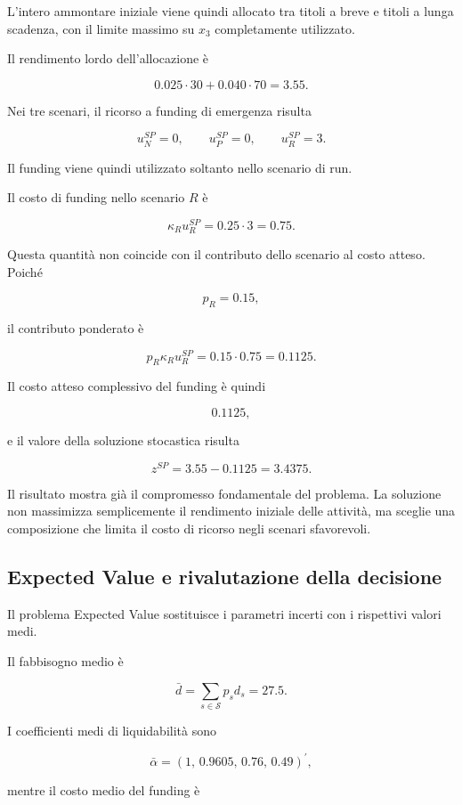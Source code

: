 L'intero ammontare iniziale viene quindi allocato tra titoli a breve e titoli
a lunga scadenza, con il limite massimo su \(x_3\) completamente utilizzato.

Il rendimento lordo dell'allocazione \`e

\[
0.025\cdot 30
+
0.040\cdot 70
=
3.55.
\]

Nei tre scenari, il ricorso a funding di emergenza risulta

\[
u_N^{SP}=0,
\qquad
u_P^{SP}=0,
\qquad
u_R^{SP}=3.
\]

Il funding viene quindi utilizzato soltanto nello scenario di run.

Il costo di funding nello scenario \(R\) \`e

\[
\kappa_R u_R^{SP}
=
0.25\cdot 3
=
0.75.
\]

Questa quantit\`a non coincide con il contributo dello scenario al costo
atteso. Poich\'e

\[
p_R=0.15,
\]

\noindent il contributo ponderato \`e

\[
p_R\kappa_Ru_R^{SP}
=
0.15\cdot 0.75
=
0.1125.
\]

Il costo atteso complessivo del funding \`e quindi

\[
0.1125,
\]

\noindent e il valore della soluzione stocastica risulta

\[
z^{SP}
=
3.55-0.1125
=
3.4375.
\]

Il risultato mostra gi\`a il compromesso fondamentale del problema. La
soluzione non massimizza semplicemente il rendimento iniziale delle
attivit\`a, ma sceglie una composizione che limita il costo di ricorso negli
scenari sfavorevoli.

\subsection{Expected Value e rivalutazione della decisione}

Il problema Expected Value sostituisce i parametri incerti con i rispettivi
valori medi.

Il fabbisogno medio \`e

\[
\bar d
=
\sum_{s\in\mathcal{S}}p_s d_s
=
27.5.
\]

I coefficienti medi di liquidabilit\`a sono

\[
\bar\alpha
=
\left(
1,\,
0.9605,\,
0.76,\,
0.49
\right)^{\prime},
\]

\noindent mentre il costo medio del funding \`e

